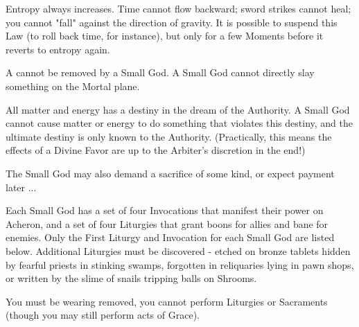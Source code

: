 {{  \item Entropy always increases.  Time cannot flow backward; sword strikes cannot heal; you cannot "fall" against the direction of gravity. It is possible to suspend this Law (to roll back time, for instance), but only for a few Moments before it reverts to entropy again.

  \item A  cannot be removed by a Small God. A Small God cannot directly slay something on the Mortal plane.

  \item All matter and energy has a destiny in the dream of the Authority.  A Small God cannot cause matter or energy to do something that violates this destiny, and the ultimate destiny is only known to the Authority. (Practically, this means the effects of a Divine Favor are up to the Arbiter's discretion in the end!)
}

The Small God may also demand a sacrifice of some kind, or expect payment later ...


\newpage


Each Small God has a set of four Invocations that manifest their power on Acheron, and a set of four Liturgies that grant boons for allies and bane for enemies.  Only the First Liturgy and Invocation for each Small God are listed below. Additional Liturgies must be discovered - etched on bronze tablets hidden by fearful priests in stinking swamps, forgotten in reliquaries lying in pawn shops, or written by the slime of snails tripping balls on Shrooms.



You must be wearing removed, you cannot perform Liturgies or Sacraments (though you may still perform acts of Grace).  

}
